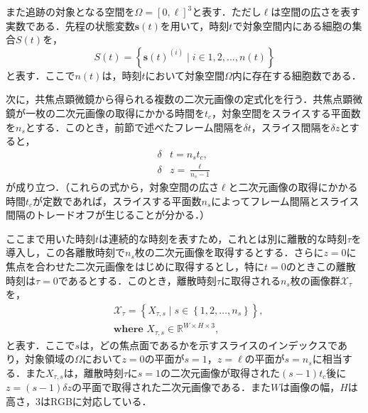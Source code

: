 また追跡の対象となる空間を$\Omega = \left[0, \ell\right]^3$と表す．ただし$\ell$は空間の広さを表す実数である．先程の状態変数$\bm{s}(t)$を用いて，時刻$t$で対象空間内にある細胞の集合$S(t)$を，
\begin{equation}
    \label{eq:set_of_cells_at_time}
    S(t) = \left\{\bm{s}(t)^{(i)} \mid i \in 1,2,\dots,n(t)\right\}
\end{equation}
と表す．ここで$n(t)$は，時刻$t$において対象空間$\Omega$内に存在する細胞数である．

次に，共焦点顕微鏡から得られる複数の二次元画像の定式化を行う．共焦点顕微鏡が一枚の二次元画像の取得にかかる時間を$t_c$，対象空間をスライスする平面数を$n_s$とする．このとき，前節で述べたフレーム間隔を$\delta t$，スライス間隔を$\delta z$とすると，
\begin{equation}
    \label{eq:delta_time_and_z}
    \begin{aligned}
        \delta & t = n_s  t_c ,
        \\ \delta & z = \frac{\ell}{n_s - 1}
    \end{aligned}
\end{equation}
が成り立つ．（これらの式から，対象空間の広さ$\ell$と二次元画像の取得にかかる時間$t_c$が定数であれば，スライスする平面数$n_s$によってフレーム間隔とスライス間隔のトレードオフが生じることが分かる．）

ここまで用いた時刻$t$は連続的な時刻を表すため，これとは別に離散的な時刻$\tau$を導入し，この各離散時刻で$n_s$枚の二次元画像を取得するとする．さらに$z = 0$に焦点を合わせた二次元画像をはじめに取得するとし，特に$t = 0$のときこの離散時刻は$\tau = 0$であるとする．このとき，離散時刻$\tau$に取得される$n_s$枚の画像群$\mathcal{X}_{\tau}$を，
\begin{equation}
    \label{eq:sliced_images}
    \begin{aligned}
        & \mathcal{X}_{\tau} = \left\{X_{\tau, s} \mid s \in \left\{1, 2, \dots, n_s\right\}\right\},
        \\ & \textbf{where } X_{\tau, s} \in \mathbb{R}^{W \times H \times 3},
    \end{aligned}
\end{equation}
と表す．ここで$s$は，どの焦点面であるかを示すスライスのインデックスであり，対象領域の$\Omega$において$z = 0$の平面が$s=1$，$z = \ell$の平面が$s=n_s$に相当する．また$X_{\tau, s}$は，離散時刻$\tau$に$s = 1$の二次元画像が取得された$(s - 1) t_c$後に$z = (s - 1) \delta z$の平面で取得された二次元画像である．また$W$は画像の幅，$H$は高さ，$3$はRGBに対応している．

